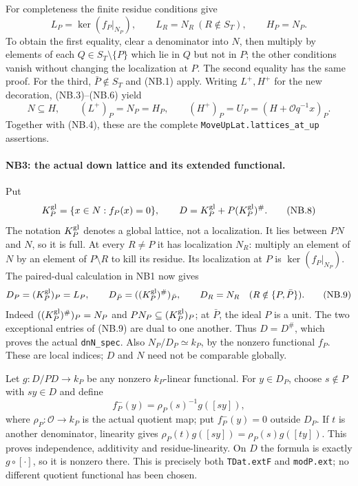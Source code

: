 \documentclass[11pt,a4paper]{article}
\numberwithin{equation}{section}
\theoremstyle{remark}\newtheorem{remark}[theorem]{Remark}
\begin{document}
For completeness the finite residue conditions give
\[
 L_P=\ker(f_P|_{N_P}),\qquad L_R=N_R\ (R\notin S_T),
 \qquad H_P=N_P.                                     \tag{NB.6}
\]
To obtain the first equality, clear a denominator into $N$, then
multiply by elements of each $Q\in S_T\setminus\{P\}$ which lie in
$Q$ but not in $P$; the other conditions vanish without changing the
localization at $P$. The second equality has the same proof. For the
third, $\bar P\notin S_T$ and (NB.1) apply. Writing $L^+,H^+$ for the
new decoration, (NB.3)--(NB.6) yield
\[
 N\subseteq H,\qquad (L^+)_P=N_P=H_P,\qquad
 (H^+)_P=U_P=(H+\mathcal Oq^{-1}x)_P.                \tag{NB.7}
\]
Together with (NB.4), these are the complete
\texttt{MoveUpLat.lattices\_\allowbreak at\_\allowbreak up} assertions.

\paragraph{NB3: the actual down lattice and its extended functional.}
Put
\[
 K_P^{\rm gl}=\{x\in N:f_P(x)=0\},\qquad
 D=K_P^{\rm gl}+P(K_P^{\rm gl})^\# .                 \tag{NB.8}
\]
The notation $K_P^{\rm gl}$ denotes a global lattice, not a localization.
It lies between $PN$ and $N$, so it is full. At every $R\ne P$ it has
localization $N_R$: multiply an element of $N$ by an element of
$P\setminus R$ to kill its residue. Its localization at $P$ is
$\ker(f_P|_{N_P})$. The paired-dual calculation in NB1 now gives
\[
 D_P=(K_P^{\rm gl})_P=L_P,\qquad
 D_{\bar P}=((K_P^{\rm gl})^\#)_{\bar P},\qquad
 D_R=N_R\quad(R\notin\{P,\bar P\}).                 \tag{NB.9}
\]
Indeed $((K_P^{\rm gl})^\#)_P=N_P$ and
$PN_P\subseteq(K_P^{\rm gl})_P$; at $\bar P$, the ideal $P$ is a unit.
The two exceptional entries of (NB.9) are dual to one another.
Thus $D=D^\#$, which proves the actual \texttt{dnN\_\allowbreak spec}.
Also $N_P/D_P\simeq k_P$, by the nonzero functional $f_P$.
These are local indices; $D$ and $N$ need not be comparable globally.

Let $g:D/PD\to k_P$ be any nonzero $k_P$-linear functional. For
$y\in D_P$, choose $s\notin P$ with $sy\in D$ and define
\[
 f_P^-(y)=\rho_P(s)^{-1}g([sy]),                     \tag{NB.10}
\]
where $\rho_P:\mathcal O\to k_P$ is the actual quotient map;
put $f_P^-(y)=0$ outside $D_P$. If $t$ is another denominator,
linearity gives $\rho_P(t)g([sy])=\rho_P(s)g([ty])$.
This proves independence, additivity and residue-linearity. On $D$
the formula is exactly $g\circ[\cdot]$, so it is nonzero there.
This is precisely both \texttt{TDat.extF} and \texttt{modP.ext};
no different quotient functional has been chosen.
\end{document}

